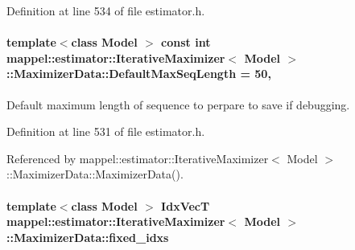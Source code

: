 Definition at line 534 of file estimator.\+h.

\paragraph[{\texorpdfstring{Default\+Max\+Seq\+Length}{DefaultMaxSeqLength}}]{\setlength{\rightskip}{0pt plus 5cm}template$<$class Model $>$ const int {\bf mappel\+::estimator\+::\+Iterative\+Maximizer}$<$ Model $>$\+::Maximizer\+Data\+::\+Default\+Max\+Seq\+Length = 50\hspace{0.3cm}{\ttfamily [static]}, {\ttfamily [protected]}}\hypertarget{classmappel_1_1estimator_1_1IterativeMaximizer_1_1MaximizerData_a38e997edb1943f364f5ec1f997d5b254}{}\label{classmappel_1_1estimator_1_1IterativeMaximizer_1_1MaximizerData_a38e997edb1943f364f5ec1f997d5b254}


Default maximum length of sequence to perpare to save if debugging. 



Definition at line 531 of file estimator.\+h.



Referenced by mappel\+::estimator\+::\+Iterative\+Maximizer$<$ Model $>$\+::\+Maximizer\+Data\+::\+Maximizer\+Data().

\paragraph[{\texorpdfstring{fixed\+\_\+idxs}{fixed_idxs}}]{\setlength{\rightskip}{0pt plus 5cm}template$<$class Model $>$ {\bf Idx\+VecT} {\bf mappel\+::estimator\+::\+Iterative\+Maximizer}$<$ Model $>$\+::Maximizer\+Data\+::fixed\+\_\+idxs}\hypertarget{classmappel_1_1estimator_1_1IterativeMaximizer_1_1MaximizerData_abb0d471c64f4f29335972f119efb6ef8}{}\label{classmappel_1_1estimator_1_1IterativeMaximizer_1_1MaximizerData_abb0d471c64f4f29335972f119efb6ef8}


